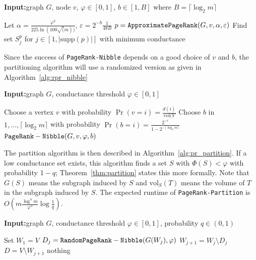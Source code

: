 \documentclass[11pt]{article}
\renewcommand{\algorithmicrequire}{\textbf{Input:}}  %
\begin{document}
\begin{algorithm}[H]
\algorithmicrequire graph $G$, node $v$, $\varphi \in [0,1]$, $b\in [1,B]$ where $B = \lceil \log_2 m \rceil$
\begin{algorithmic}
	\State Let $\alpha = \frac{\varphi^2}{225 \ln(100\sqrt(m))}$, $\varepsilon = 2^{-b}\frac{1}{48B}$
	\State $p = {\tt ApproximatePageRank}(G,v,\alpha,\varepsilon)$
	\State Find set $S_j^p$ for $j\in[1,|\text{supp}(p)|]$ with minimum conductance
	\EndIf
\end{algorithmic}
\caption{${\tt PageRank-Nibble}(G,v,\varphi,b)$} \label{alg:pr_nibble}
\end{algorithm}

Since the success of {\tt PageRank-Nibble} depends on a good choice of $v$ and $b$, the partitioning algorithm will use a randomized version as given in Algorithm~\ref{alg:rpr_nibble}

\begin{algorithm}[H]
\algorithmicrequire graph $G$, conductance threshold $\varphi \in [0,1]$
\begin{algorithmic}
	\State Choose a vertex $v$ with probability $\Pr(v=i) = \frac{d(i)}{\text{vol}(V}$
	\State Choose $b$ in $1,\ldots, \lceil \log_2 m \rceil$ with probability $\Pr(b=i) = \frac{2^{-i}}{1-2^{-\lceil \log_2 m \rceil}}$
	\State \Return ${\tt PageRank-Nibble}(G,v,\varphi,b)$
\end{algorithmic}
\caption{${\tt RandomPageRank-Nibble}(G,\varphi)$} \label{alg:rpr_nibble}
\end{algorithm}

The partition algorithm is then described in Algorithm~\ref{alg:pr_partition}. If a low conductance set exists, this algorithm finds a set $S$ with $\Phi(S) < \varphi$ with probability $1-q$; Theorem~\ref{thm:partition} states this more formally. Note that $G(S)$ means the subgraph induced by $S$ and $\text{vol}_{S}(T)$ means the volume of $T$ in the subgraph induced by $S$. The expected runtime of {\tt PageRank-Partition} is $O\left(m \frac{\log^4 m}{\varphi^3} \log \frac{1}{q} \right)$.

\begin{algorithm}[H]
\algorithmicrequire graph $G$, conductance threshold $\varphi \in [0,1]$, probability $q \in(0,1)$
\begin{algorithmic}
	\State Set $W_1 = V$
		\State $D_j = {\tt RandomPageRank-Nibble}(G(W_j),\varphi)$
		\State $W_{j+1} = W_j \setminus D_j$
			\Return $D = V\setminus W_{j+1}$
		\EndIf
	\EndFor
	\State \Return nothing
\end{algorithmic}
\caption{${\tt PageRank-Partition}(G,\varphi,q)$} \label{alg:pr_partition}
\end{algorithm}
\end{document}
